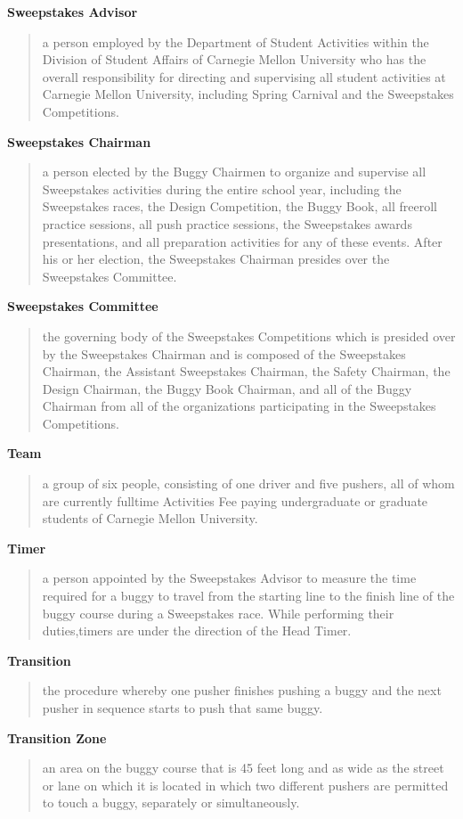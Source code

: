 \textbf{Sweepstakes Advisor}
\begin{quote}
	a person employed by the Department of Student Activities within the Division of Student Affairs of Carnegie Mellon University who has the overall responsibility for directing and supervising all student activities at Carnegie Mellon University, including Spring Carnival and the Sweepstakes Competitions.
\end{quote}

\textbf{Sweepstakes Chairman}
\begin{quote}
	a person elected by the Buggy Chairmen to organize and supervise all Sweepstakes activities during the entire school year, including the Sweepstakes races, the Design Competition, the Buggy Book, all freeroll practice sessions, all push practice sessions, the Sweepstakes awards presentations, and all preparation activities for any of these events. After his or her election, the Sweepstakes Chairman presides over the Sweepstakes Committee.
\end{quote}

\textbf{Sweepstakes Committee}
\begin{quote}
	the governing body of the Sweepstakes Competitions which is presided over by the Sweepstakes Chairman and is composed of the Sweepstakes Chairman, the Assistant Sweepstakes Chairman, the Safety Chairman, the Design Chairman, the Buggy Book Chairman, and all of the Buggy Chairman from all of the organizations participating in the Sweepstakes Competitions.
\end{quote}

\textbf{Team}
\begin{quote}
	a group of six people, consisting of one driver and five pushers, all of whom are currently fulltime Activities Fee paying undergraduate or graduate students of Carnegie Mellon University.
\end{quote}

\textbf{Timer}
\begin{quote}
	a person appointed by the Sweepstakes Advisor to measure the time required for a buggy to travel from the starting line to the finish line of the buggy course during a Sweepstakes race. While performing their duties,timers are under the direction of the Head Timer.
\end{quote}

\textbf{Transition}
\begin{quote}
	the procedure whereby one pusher finishes pushing a buggy and the next pusher in sequence starts to push that same buggy.
\end{quote}

\textbf{Transition Zone}
\begin{quote}
	an area on the buggy course that is 45 feet long and as wide as the street or lane on which it is located in which two different pushers are permitted to touch a buggy, separately or simultaneously.
\end{quote}


